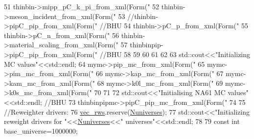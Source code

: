 \begin{DoxyCode}
{{{{{{{51     thinbin->mipp\_pC\_k\_pi\_from\_xml(Form(\textcolor{stringliteral}{"%
52     thinbin->meson\_incident\_from\_xml(Form(\textcolor{stringliteral}{"%
53     \textcolor{comment}{//thinbin->pipC\_pip\_from\_xml(Form("%
              //BHU}
54     thinbin->pC\_p\_from\_xml(Form(\textcolor{stringliteral}{"%
55     thinbin->pC\_n\_from\_xml(Form(\textcolor{stringliteral}{"%
56     thinbin->material\_scaling\_from\_xml(Form(\textcolor{stringliteral}{"%
57     thinbinpip->pipC\_pip\_from\_xml(Form(\textcolor{stringliteral}{"%
               \textcolor{comment}{//BHU}
58 
59 
60     
61 
62     
63     std::cout<<\textcolor{stringliteral}{"Initializing MC values"}<<std::endl;
64     mymc->pip\_mc\_from\_xml(Form(\textcolor{stringliteral}{"%
65     mymc->pim\_mc\_from\_xml(Form(\textcolor{stringliteral}{"%
66     mymc->kap\_mc\_from\_xml(Form(\textcolor{stringliteral}{"%
67     mymc->kam\_mc\_from\_xml(Form(\textcolor{stringliteral}{"%
68     mymc->k0l\_mc\_from\_xml(Form(\textcolor{stringliteral}{"%
69     mymc->k0s\_mc\_from\_xml(Form(\textcolor{stringliteral}{"%
70 
71 
72     std::cout<<\textcolor{stringliteral}{"Initialising NA61 MC values"}<<std::endl;                            \textcolor{comment}{//BHU}
73     thinbinpipmc->pipC\_pip\_mc\_from\_xml(Form(\textcolor{stringliteral}{"%
74 
75     \textcolor{comment}{//Reweighter drivers:}
76     \hyperlink{class_neutrino_flux_reweight_1_1_make_reweight_a5110b72da0e87323e3f38703a48e7f3f}{vec\_rws}.reserve(\hyperlink{class_neutrino_flux_reweight_1_1_make_reweight_a172e839a27e6c89dbaf9cb493c99bbef}{Nuniverses});
77     std::cout<<\textcolor{stringliteral}{"Initializing reweight drivers for "}<<\hyperlink{class_neutrino_flux_reweight_1_1_make_reweight_a172e839a27e6c89dbaf9cb493c99bbef}{Nuniverses}<<\textcolor{stringliteral}{" universes"}<<std::endl;
78     
79     \textcolor{keyword}{const} \textcolor{keywordtype}{int} base\_universe=1000000;
}}}}}}}}}}}}}}}}}}}}
\end{DoxyCode}
